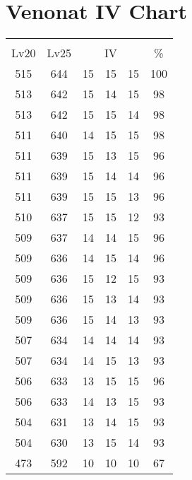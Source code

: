 \documentclass{article}%
\begin{document}
%
\normalsize%
\section{Venonat IV Chart}%
\label{sec:Venonat IV Chart}%
\renewcommand{\arraystretch}{1.5}%
\begin{tabular}{|c|c|c|c|c|c|}%
\hline%
\multicolumn{6}{|c|}{\textcolor{white}{ 
\linebreak{Venonat}
}%
\cellcolor{black}}\\%
\multicolumn{1}{|c}{Lv20}&\multicolumn{1}{c|}{Lv25}&\multicolumn{3}{c|}{IV}&\multicolumn{1}{|c|}{\%}\\%
\hline%
\rowcolor{color100}%
515&644&15&15&15&100\\%
\hline%
\rowcolor{color98}%
513&642&15&14&15&98\\%
\hline%
\rowcolor{color98}%
513&642&15&15&14&98\\%
\hline%
\rowcolor{color98}%
511&640&14&15&15&98\\%
\hline%
\rowcolor{color96}%
511&639&15&13&15&96\\%
\hline%
\rowcolor{color96}%
511&639&15&14&14&96\\%
\hline%
\rowcolor{color96}%
511&639&15&15&13&96\\%
\hline%
\rowcolor{color93}%
510&637&15&15&12&93\\%
\hline%
\rowcolor{color96}%
509&637&14&14&15&96\\%
\hline%
\rowcolor{color96}%
509&636&14&15&14&96\\%
\hline%
\rowcolor{color93}%
509&636&15&12&15&93\\%
\hline%
\rowcolor{color93}%
509&636&15&13&14&93\\%
\hline%
\rowcolor{color93}%
509&636&15&14&13&93\\%
\hline%
\rowcolor{color93}%
507&634&14&14&14&93\\%
\hline%
\rowcolor{color93}%
507&634&14&15&13&93\\%
\hline%
\rowcolor{color96}%
506&633&13&15&15&96\\%
\hline%
\rowcolor{color93}%
506&633&14&13&15&93\\%
\hline%
\rowcolor{color93}%
504&631&13&14&15&93\\%
\hline%
\rowcolor{color93}%
504&630&13&15&14&93\\%
\hline%
\rowcolor{color91}%
473&592&10&10&10&67\\%
\end{tabular}

%
\end{document}
